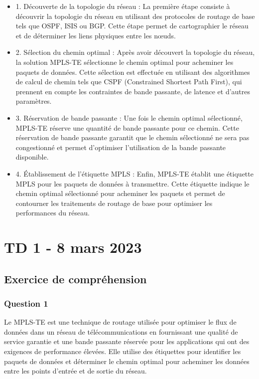 \documentclass[12pt, a4paper]{article}
\begin{document}
\begin{itemize}
    \item 1. Découverte de la topologie du réseau : La première étape consiste à découvrir la topologie du réseau en utilisant des protocoles de routage de base tels que OSPF, ISIS ou BGP. Cette étape permet de cartographier le réseau et de déterminer les liens physiques entre les nœuds.
    \item 2. Sélection du chemin optimal : Après avoir découvert la topologie du réseau, la solution MPLS-TE sélectionne le chemin optimal pour acheminer les paquets de données. Cette sélection est effectuée en utilisant des algorithmes de calcul de chemin tels que CSPF (Constrained Shortest Path First), qui prennent en compte les contraintes de bande passante, de latence et d'autres paramètres.
    \item 3. Réservation de bande passante : Une fois le chemin optimal sélectionné, MPLS-TE réserve une quantité de bande passante pour ce chemin. Cette réservation de bande passante garantit que le chemin sélectionné ne sera pas congestionné et permet d'optimiser l'utilisation de la bande passante disponible.
    \item 4. Établissement de l'étiquette MPLS : Enfin, MPLS-TE établit une étiquette MPLS pour les paquets de données à transmettre. Cette étiquette indique le chemin optimal sélectionné pour acheminer les paquets et permet de contourner les traitements de routage de base pour optimiser les performances du réseau.
\end{itemize}

\newpage
\section{TD 1 - 8 mars 2023}
	\subsection{Exercice de compréhension}
		\subsubsection{Question 1}
		Le MPLS-TE est une technique de routage utilisée pour optimiser 
		le flux de données dans un réseau de télécommunications en fournissant 
		une qualité de service garantie et une bande passante réservée pour 
		les applications qui ont des exigences de performance élevées. 
		Elle utilise des étiquettes pour identifier les paquets de données et 
		déterminer le chemin optimal pour acheminer les données entre les 
		points d'entrée et de sortie du réseau.
\end{document}
